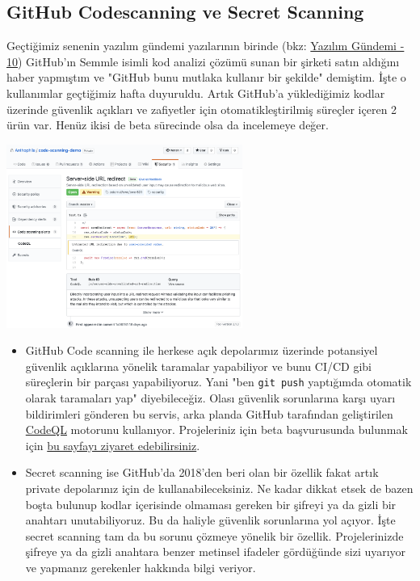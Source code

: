 \documentclass[11pt]{article}
\begin{document}
\subsection{GitHub Codescanning ve Secret Scanning}
\label{sec:orgf433e4a}
Geçtiğimiz senenin yazılım gündemi yazılarının birinde (bkz: \href{../10/yazilim-gundemi-2020-10.pdf}{Yazılım
Gündemi - 10}) GitHub'ın Semmle isimli kod analizi çözümü sunan bir şirketi
satın aldığını haber yapmıştım ve "GitHub bunu mutlaka kullanır bir şekilde"
demiştim. İşte o kullanımlar geçtiğimiz hafta duyuruldu. Artık GitHub'a
yüklediğimiz kodlar üzerinde güvenlik açıkları ve zafiyetler için
otomatikleştirilmiş süreçler içeren 2 ürün var. Henüz ikisi de beta sürecinde
olsa da incelemeye değer.

\begin{center}
\includegraphics[height=6cm]{gorseller/github-codescanning.png}
\end{center}

\begin{itemize}
\item GitHub Code scanning ile herkese açık depolarımız üzerinde potansiyel
güvenlik açıklarına yönelik taramalar yapabiliyor ve bunu CI/CD gibi
süreçlerin bir parçası yapabiliyoruz. Yani "ben \texttt{git push} yaptığımda
otomatik olarak taramaları yap" diyebileceğiz. Olası güvenlik sorunlarına
karşı uyarı bildirimleri gönderen bu servis, arka planda GitHub tarafından
geliştirilen \href{https://github.com/github/codeql}{CodeQL} motorunu kullanıyor. Projeleriniz için beta
başvurusunda bulunmak için \href{https://github.com/features/security/advanced-security/signup}{bu sayfayı ziyaret edebilirsiniz}.
\item Secret scanning ise GitHub'da 2018'den beri olan bir özellik fakat artık
private depolarınız için de kullanabileceksiniz. Ne kadar dikkat etsek de
bazen boşta bulunup kodlar içerisinde olmaması gereken bir şifreyi ya da
gizli bir anahtarı unutabiliyoruz. Bu da haliyle güvenlik sorunlarına yol
açıyor. İşte secret scanning tam da bu sorunu çözmeye yönelik bir özellik.
Projelerinizde şifreye ya da gizli anahtara benzer metinsel ifadeler
gördüğünde sizi uyarıyor ve yapmanız gerekenler hakkında bilgi veriyor.
\end{itemize}
\end{document}
